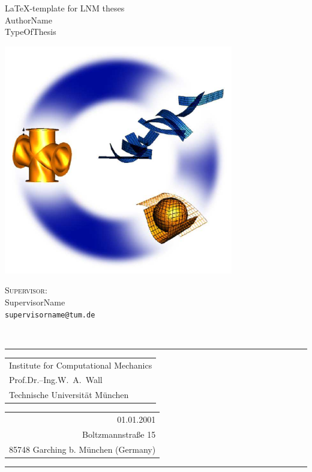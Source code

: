 \documentclass[12pt,a4paper]{article}
\newcommand{\thesistype}{TypeOfThesis}
\newcommand{\thesistitle}{\LaTeX-template for LNM theses}
\newcommand{\Author}{AuthorName}
\newcommand{\Supervisor}{SupervisorName}
\newcommand{\DateOfSubmission}{01.01.2001}
\begin{document}
\begin{titlepage}
\begin{center}
\Huge{\thesistitle}
\\
\vspace{0.2cm}
\LARGE{\Author}
\\
\vspace{0.2cm}
\large{\thesistype}
\end{center}
\vspace{0.1cm}
%
\begin{center}
\includegraphics[width=10cm]{fig/nilifem}
\end{center}
%
\vfill
%
\begin{minipage}[c]{1.0\textwidth}
\centering
{\large \scshape Supervisor:}\\
{\Supervisor}\\
\texttt{supervisorname@tum.de}\\
\end{minipage}
%
\vspace{1cm}\\
%
\rule{\textwidth}{1pt}
%
\begin{tabular}[t]{l}
Institute for Computational Mechanics
\\
  Prof.\@ Dr.--Ing.\@ W.\ A.\ Wall
\\
Technische Universit\"at M\"unchen
\end{tabular}
\hfill
\begin{tabular}[t]{r}
\DateOfSubmission
\\
Boltzmannstra\ss e 15
\\
85748 Garching b. M\"unchen (Germany)\\
\end{tabular}
\rule{\textwidth}{1pt}

\end{titlepage}
\end{document}
